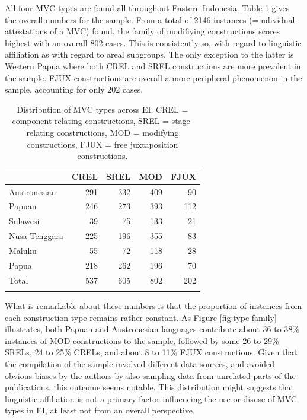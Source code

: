 All four MVC types are found all throughout Eastern Indonesia. Table \ref{table:MVCtypes_overview} gives the overall numbers for the sample. From a total of 2146 instances (=individual attestations of a MVC) found, the family of modifiying constructions scores highest with an overall 802 cases. This is consistently so, with regard to linguistic affiliation as with regard to areal subgroups. The only exception to the latter is Western Papua where both CREL and SREL constructions are more prevalent in the sample. FJUX constructions are overall a more peripheral phenomenon in the sample, accounting for only 202 cases.

\begin{table}
\begin{tabular}{lrrrr}
  \lsptoprule
 & CREL & SREL & MOD & FJUX \tabularnewline 
  \midrule
  Austronesian & 291 & 332 & 409 & 90 \tabularnewline
  Papuan & 246 & 273 &  393 &  112  \tabularnewline
   \midrule
  Sulawesi & 39 & 75 & 133 & 21 \tabularnewline
  Nusa Tenggara & 225 & 196 & 355 & 83 \tabularnewline
  Maluku & 55 & 72 & 118 & 28 \tabularnewline 
  Papua & 218 & 262 & 196 & 70 \tabularnewline 
\midrule
Total & 537 & 605 & 802 & 202 \tabularnewline
\lspbottomrule
\end{tabular}
\caption[Distribution of MVC types]{Distribution of MVC types across EI. CREL = component-relating constructions, SREL = stage-relating constructions, MOD = modifying constructions, FJUX = free juxtaposition constructions.}
\label{table:MVCtypes_overview}
\end{table}

What is remarkable about these numbers is that the proportion of instances from each construction type remains rather constant. As Figure \ref{fig:type-family} illustrates, both Papuan and Austronesian languages contribute about 36 to 38\% instances of MOD constructions to the sample, followed by some 26 to 29\% SRELs, 24 to 25\% CRELs, and about 8 to 11\% FJUX constructions. Given that the compilation of the sample involved different data sources, and avoided obvious biases by the authors by also sampling data from unrelated parts of the publications, this outcome seems notable. This distribution might suggests that linguistic affiliation is not a primary factor influencing the use or disuse of MVC types in EI, at least not from an overall perspective.


